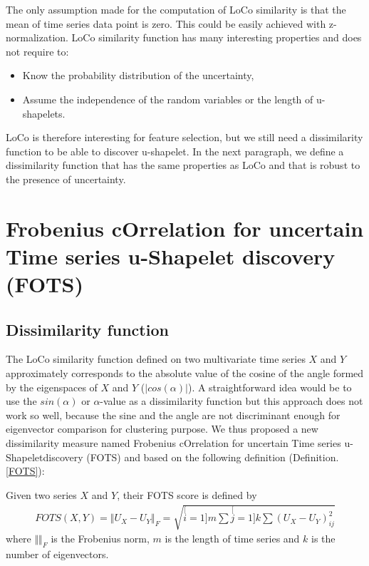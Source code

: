 The only assumption made for the computation of LoCo similarity is that the mean of time
series data point is zero. This could be easily achieved with z-normalization.
LoCo similarity function has many interesting properties and does not require to:
\begin{itemize}
  \item  Know the probability distribution of the uncertainty,
  \item Assume the independence of the random variables or the length of
  u-shapelets.
\end{itemize}

LoCo is therefore interesting for feature selection, but we still need a dissimilarity
function to be able to discover u-shapelet. In the next paragraph, we 
define a dissimilarity function that has the same properties as LoCo and that is
robust to the presence of uncertainty.





\section[FOTS]{Frobenius cOrrelation for uncertain Time series u-Shapelet discovery (FOTS)}
\subsection{Dissimilarity function}

The LoCo similarity function defined on two multivariate time series $X$ and $Y$ approximately corresponds  to the absolute value of the cosine of the angle formed by the eigenspaces of $X$ and $Y$ ($|cos(\alpha)|$). A straightforward idea would be to use the $sin(\alpha)$ or $\alpha$-value as a dissimilarity function but this approach does not work so well, because the sine and the angle are not discriminant enough for eigenvector comparison for clustering purpose. We thus proposed a new dissimilarity measure named Frobenius cOrrelation for uncertain Time series u-Shapeletdiscovery (FOTS) and based on the following definition (Definition. \ref{FOTS}): 


\begin{definition}
\label{FOTS}
 Given two series $X$
and $Y$, their FOTS score is defined by
\begin{eqnarray}
FOTS(X,Y)=\Vert U_{X}-U_{Y}\Vert_{F}
=\sqrt{\stackrel[i=1]{m}{\sum}\stackrel[j=1]{k}{\sum}(U_{X}-U_{Y})_{ij}^{2}}
\end{eqnarray}
where $\Vert\Vert_{F}$ is the Frobenius norm, $m$ is the length of time series and $k$ is the number of eigenvectors.
\end{definition}
 
